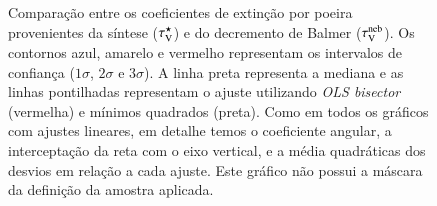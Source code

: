 \begin{figure}
	\centering
	\caption[Comparação entre os coeficientes de extinção.] 
	{Comparação entre os coeficientes de extinção por poeira provenientes da síntese ($\tau_{\mathrm{V}}^\star$) e
do decremento de Balmer ($\tau_{\mathrm{V}}^{\mathrm{neb}}$). Os contornos azul, amarelo e vermelho representam os intervalos
de confiança ($1\sigma$, $2\sigma$ e $3\sigma$). A linha preta representa a mediana e as linhas
pontilhadas representam o ajuste utilizando {\em OLS bisector} (vermelha) e mínimos quadrados
(preta). Como em todos os gráficos com ajustes lineares, em detalhe temos o coeficiente angular, a
interceptação da reta com o eixo vertical, e a média quadráticas dos desvios em relação a cada
ajuste. Este gráfico não possui a máscara da definição da amostra aplicada.}
	\label{fig:tauVsynvsneb}
\end{figure}

